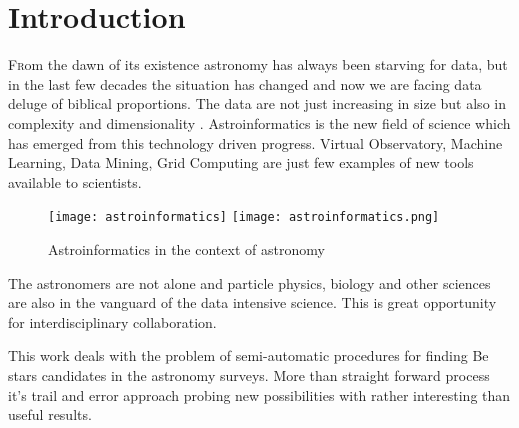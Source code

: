 \chapter*{Introduction}
\fancyhead{}
\fancyhead{}


\renewcommand{\LettrineFontHook}{\color{red}}


\lettrine[lines = 3, loversize=-0.1, lraise=0.1]{F}rom the dawn of its
existence astronomy has always been starving for data, but in the last
few decades the situation has changed and now we are facing data
deluge of biblical proportions. The data are not just increasing in
size but also in complexity and
dimensionality \citep{ballastroinformatics}. Astroinformatics is the
new field of science which has emerged from this technology driven
progress.  Virtual Observatory, Machine Learning, Data Mining, Grid
Computing are just few examples of new tools available to scientists.


\vspace{10pt}
\begin{figure}[!htbp]
  \begin{center}
    \leavevmode
    \ifpdf
    \texttt{[image: astroinformatics]}
    \else
    \texttt{[image: astroinformatics.png]}
    \fi
    \caption{Astroinformatics in the context of astronomy \cite{ballastroinformatics} }
    \label{FigAir}
  \end{center}
\end{figure}
\vspace{-10pt}



The astronomers are not alone and particle physics, biology and other
sciences are also in the vanguard of the data intensive science. This
is great opportunity for interdisciplinary collaboration.

This work deals with the problem of semi-automatic procedures for
finding Be stars \cite{porter2003classical} candidates in the
astronomy surveys. More than straight forward process it's trail and
error approach probing new possibilities with rather interesting than
useful results.

